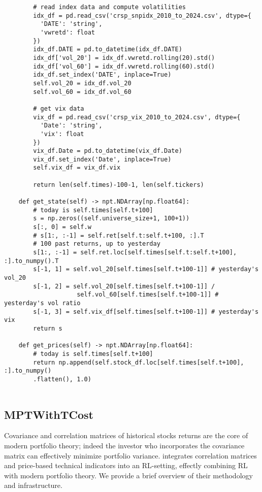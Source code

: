 \begin{verbatim}
        # read index data and compute volatilities
        idx_df = pd.read_csv('crsp_snpidx_2010_to_2024.csv', dtype={
          'DATE': 'string',
          'vwretd': float
        })
        idx_df.DATE = pd.to_datetime(idx_df.DATE)
        idx_df['vol_20'] = idx_df.vwretd.rolling(20).std()
        idx_df['vol_60'] = idx_df.vwretd.rolling(60).std()
        idx_df.set_index('DATE', inplace=True)
        self.vol_20 = idx_df.vol_20
        self.vol_60 = idx_df.vol_60
    
        # get vix data
        vix_df = pd.read_csv('crsp_vix_2010_to_2024.csv', dtype={
          'Date': 'string',
          'vix': float
        })
        vix_df.Date = pd.to_datetime(vix_df.Date)
        vix_df.set_index('Date', inplace=True)
        self.vix_df = vix_df.vix
        
        return len(self.times)-100-1, len(self.tickers)
    
    def get_state(self) -> npt.NDArray[np.float64]:
        # today is self.times[self.t+100]
        s = np.zeros((self.universe_size+1, 100+1))
        s[:, 0] = self.w
        # s[1:, :-1] = self.ret[self.t:self.t+100, :].T
        # 100 past returns, up to yesterday
        s[1:, :-1] = self.ret.loc[self.times[self.t:self.t+100], :].to_numpy().T
        s[-1, 1] = self.vol_20[self.times[self.t+100-1]] # yesterday's vol_20
        s[-1, 2] = self.vol_20[self.times[self.t+100-1]] / 
                    self.vol_60[self.times[self.t+100-1]] # yesterday's vol ratio
        s[-1, 3] = self.vix_df[self.times[self.t+100-1]] # yesterday's vix
        return s

    def get_prices(self) -> npt.NDArray[np.float64]:
        # today is self.times[self.t+100]
        return np.append(self.stock_df.loc[self.times[self.t+100], :].to_numpy()
        .flatten(), 1.0)
  
\end{verbatim}

\subsection{MPTWithTCost}

Covariance and correlation matrices of historical stocks returns are the core of modern portfolio theory; 
indeed the investor 
who incorporates the covariance matrix can effectively minimize portfolio variance. 
\cite{drl_modern_portfolio_theory} integrates correlation matrices and price-based technical 
indicators into an RL-setting, effectly combining RL with modern portfolio theory. We provide a brief overview 
of their methodology and infrastructure.

